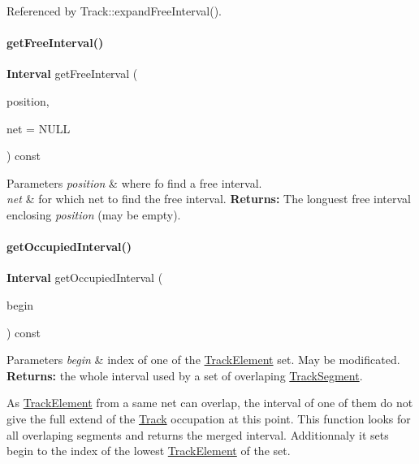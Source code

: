 Referenced by Track\+::expand\+Free\+Interval().

\mbox{\label{classKite_1_1Track_aa9c09467d45d95b3ac2b58f09c04ff8d}} 
\paragraph{\texorpdfstring{get\+Free\+Interval()}{getFreeInterval()}}
{\footnotesize\ttfamily \textbf{ Interval} get\+Free\+Interval (\begin{DoxyParamCaption}\item[{\textbf{ Db\+U\+::\+Unit}}]{position,  }\item[{\textbf{ Net} $\ast$}]{net = {\ttfamily NULL} }\end{DoxyParamCaption}) const}


\begin{DoxyParams}{Parameters}
{\em position} & where fo find a free interval. \\
\hline
{\em net} & for which net to find the free interval. {\bfseries Returns\+:} The longuest free interval enclosing {\itshape position} (may be empty). \\
\hline
\end{DoxyParams}
\mbox{\label{classKite_1_1Track_ae87a2e7c9632b60737162295542e3e93}} 
\paragraph{\texorpdfstring{get\+Occupied\+Interval()}{getOccupiedInterval()}}
{\footnotesize\ttfamily \textbf{ Interval} get\+Occupied\+Interval (\begin{DoxyParamCaption}\item[{size\+\_\+t \&}]{begin }\end{DoxyParamCaption}) const}


\begin{DoxyParams}{Parameters}
{\em begin} & index of one of the \mbox{\hyperlink{classKite_1_1TrackElement}{Track\+Element}} set. May be modificated. {\bfseries Returns\+:} the whole interval used by a set of overlaping \mbox{\hyperlink{classKite_1_1TrackSegment}{Track\+Segment}}.\\
\hline
\end{DoxyParams}
As \mbox{\hyperlink{classKite_1_1TrackElement}{Track\+Element}} from a same net can overlap, the interval of one of them do not give the full extend of the \mbox{\hyperlink{classKite_1_1Track}{Track}} occupation at this point. This function looks for all overlaping segments and returns the merged interval. Additionnaly it sets {\ttfamily begin} to the index of the lowest \mbox{\hyperlink{classKite_1_1TrackElement}{Track\+Element}} of the set.

